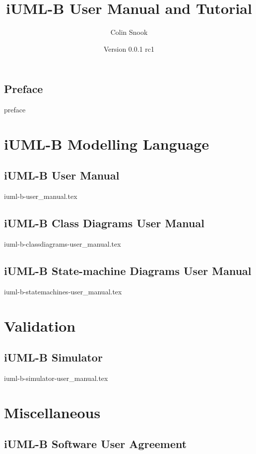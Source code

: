 \documentclass[a4paper,10pt]{book}
\title{iUML-B User Manual and Tutorial}
\author{Colin Snook}
\date{%
  Version 0.0.1 rc1\\%
  \displaydate{iUML-BManualDate}%
}
\begin{document}
\maketitle

\tableofcontents

\chapter*{Preface}
{preface}

\part{iUML-B Modelling Language}

\chapter{iUML-B User Manual}
\label{cha:iuml-b-user}
{iuml-b-user_manual.tex}

\chapter{iUML-B Class Diagrams User Manual}
\label{cha:iuml-b-classdiagram-user}
{iuml-b-classdiagrams-user_manual.tex}

\chapter{iUML-B State-machine Diagrams User Manual}
\label{cha:iuml-b-statemachines-user}
{iuml-b-statemachines-user_manual.tex}


\part{Validation}

\chapter{iUML-B Simulator}
\label{cha:iuml-b-simulator}
{iuml-b-simulator-user_manual.tex}


\part{Miscellaneous}
\label{part:miscellaneous}

\chapter{iUML-B Software User Agreement}
\label{cha:iuml-b-software-user-agreement}

\end{document}
